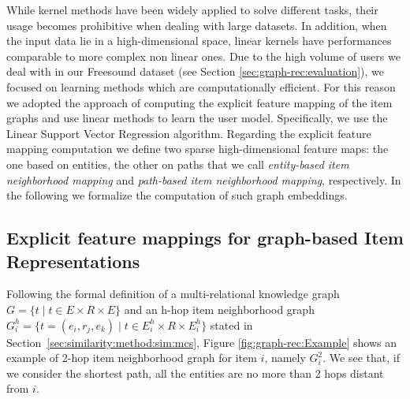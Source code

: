 While kernel methods have been widely applied to solve different tasks, their usage becomes prohibitive when dealing with large datasets. 
In addition, when the input data lie in a high-dimensional space, linear kernels have performances comparable to more complex non linear ones. 
Due to the high volume of users we deal with in our Freesound dataset (see Section \ref{sec:graph-rec:evaluation}), we focused on learning methods which are computationally efficient. For this reason we adopted the approach of computing the explicit feature mapping of the item graphs and use linear methods to learn the user model. Specifically, we use the Linear Support Vector Regression \citep{HoL12} algorithm. 
Regarding the explicit feature mapping computation we define two sparse high-dimensional feature maps: the one based on entities, the other on paths that we call \textit{entity-based item neighborhood mapping} and \textit{path-based item neighborhood mapping}, respectively. In the following we formalize the computation of such graph embeddings.

\subsection{Explicit feature mappings for graph-based Item Representations}

Following the formal definition of a multi-relational knowledge graph $G=\lbrace t \mid t \in E \times R \times E \rbrace$ and an h-hop item neighborhood graph $G^h_i=\lbrace t=(e_i,r_j,e_k) \mid t \in E^h_i \times R \times E^h_i \rbrace$ stated in Section~\ref{sec:similarity:method:sim:mcs}, Figure \ref{fig:graph-rec:Example} shows an example of 2-hop item neighborhood graph for item $i$, namely $G^2_i$. We see that, if we consider the shortest path, all the entities are no more than 2 hops distant from $i$. 

